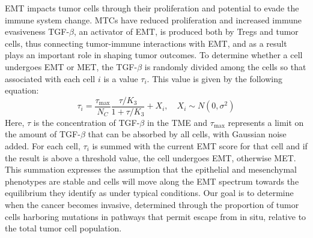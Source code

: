 \documentclass[11pt]{article}
\begin{document}
\begin{framed}
\newline
EMT impacts tumor cells through their proliferation and potential to evade the immune system change. MTCs have reduced proliferation %
and increased immune evasiveness %
TGF-$\beta$, an activator of EMT, is produced both by Tregs and tumor cells, thus connecting tumor-immune interactions with EMT, and as a result plays an important role in shaping tumor outcomes.
To determine whether a cell undergoes EMT or MET, the TGF-$\beta$ is randomly divided among the cells so that associated with each cell $i$ is a value $\tau_i$.
This value is given by the following equation:
$$
\tau_i = \frac{\tau_{\text{max}}}{N_C}\frac{\tau/K_3}{1+\tau/K_3} + X_i, \quad X_i \sim N(0,\sigma^2)
$$
Here, $\tau$ is the concentration of TGF-$\beta$ in the TME and $\tau_\text{max}$ represents a limit on the amount of TGF-$\beta$ that can be absorbed by all cells, with Gaussian noise added.
\newline
For each cell, $\tau_i$ is summed with the current EMT score for that cell and if the result is above a threshold value, the cell undergoes EMT, otherwise MET.
This summation expresses the assumption that the epithelial and mesenchymal phenotypes are stable and cells will move along the EMT spectrum towards the equilibrium they identify as under typical conditions.
    \newline
    Our goal is to determine when the cancer becomes invasive, determined through the proportion of tumor cells harboring mutations in pathways that permit escape from in situ, relative to the total tumor cell population.
  \end{framed}
\end{document}
